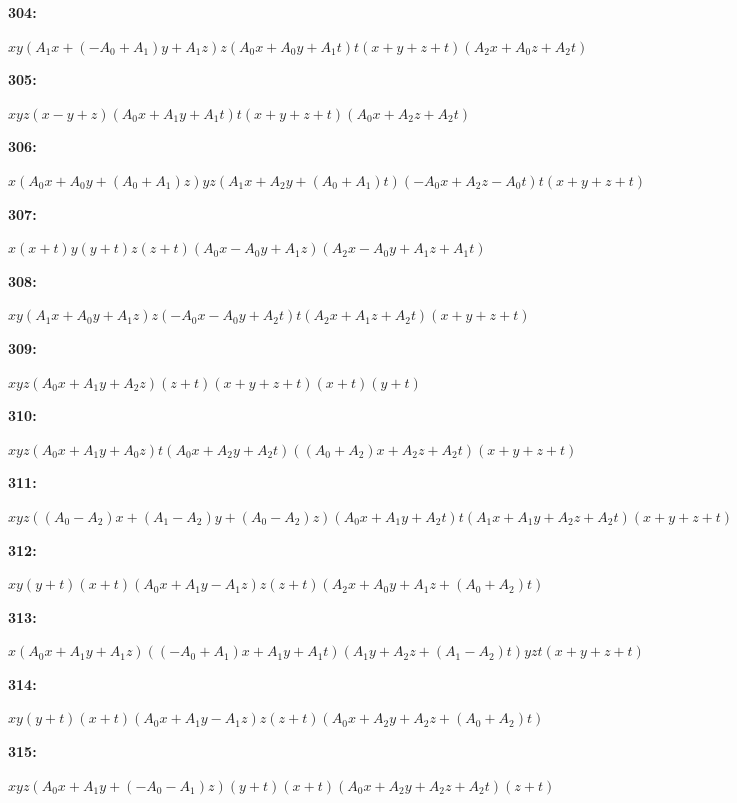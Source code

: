 \documentclass[12pt]{amsart}
\theoremstyle{plain}
\theoremstyle{remark}
\theoremstyle{definition}
\numberwithin{table}{section}
\begin{document}
\noindent\parbox[right]{9mm}{\textbf{304:}}\parbox{3mm}{\hfill}%
\parbox[t]{15cm}{\(xy(A_{1}x + (-A_{0} + A_{1})y + A_{1}z)z(A_{0}x + A_{0}y + A_{1}t)t(x + y + z + t)(A_{2}x + A_{0}z + A_{2}t)\)}

\noindent\parbox[right]{9mm}{\textbf{305:}}\parbox{3mm}{\hfill}%
\parbox[t]{15cm}{\(xyz(x - y + z)(A_{0}x + A_{1}y + A_{1}t)t(x + y + z + t)(A_{0}x + A_{2}z + A_{2}t)\)}

\noindent\parbox[right]{9mm}{\textbf{306:}}\parbox{3mm}{\hfill}%
\parbox[t]{15cm}{\(x(A_{0}x + A_{0}y + (A_{0} + A_{1})z)yz(A_{1}x + A_{2}y + (A_{0} + A_{1})t)(-A_{0}x + A_{2}z - A_{0}t)t(x + y + z + t)\)}

\noindent\parbox[right]{9mm}{\textbf{307:}}\parbox{3mm}{\hfill}%
\parbox[t]{15cm}{\(x(x + t)y(y + t)z(z + t)(A_{0}x - A_{0}y + A_{1}z)(A_{2}x - A_{0}y + A_{1}z + A_{1}t)\)}

\noindent\parbox[right]{9mm}{\textbf{308:}}\parbox{3mm}{\hfill}%
\parbox[t]{15cm}{\(xy(A_{1}x + A_{0}y + A_{1}z)z(-A_{0}x - A_{0}y + A_{2}t)t(A_{2}x + A_{1}z + A_{2}t)(x + y + z + t)\)}

\noindent\parbox[right]{9mm}{\textbf{309:}}\parbox{3mm}{\hfill}%
\parbox[t]{15cm}{\(xyz(A_{0}x + A_{1}y + A_{2}z)(z + t)(x + y + z + t)(x + t)(y + t)\)}

\noindent\parbox[right]{9mm}{\textbf{310:}}\parbox{3mm}{\hfill}%
\parbox[t]{15cm}{\(xyz(A_{0}x + A_{1}y + A_{0}z)t(A_{0}x + A_{2}y + A_{2}t)((A_{0} + A_{2})x + A_{2}z + A_{2}t)(x + y + z + t)\)}

\noindent\parbox[right]{9mm}{\textbf{311:}}\parbox{3mm}{\hfill}%
\parbox[t]{15cm}{\(xyz((A_{0} - A_{2})x + (A_{1} - A_{2})y + (A_{0} - A_{2})z)(A_{0}x + A_{1}y + A_{2}t)t(A_{1}x + A_{1}y + A_{2}z + A_{2}t)(x + y + z + t)\)}

\noindent\parbox[right]{9mm}{\textbf{312:}}\parbox{3mm}{\hfill}%
\parbox[t]{15cm}{\(xy(y + t)(x + t)(A_{0}x + A_{1}y - A_{1}z)z(z + t)(A_{2}x + A_{0}y + A_{1}z + (A_{0} + A_{2})t)\)}

\noindent\parbox[right]{9mm}{\textbf{313:}}\parbox{3mm}{\hfill}%
\parbox[t]{15cm}{\(x(A_{0}x + A_{1}y + A_{1}z)((-A_{0} + A_{1})x + A_{1}y + A_{1}t)(A_{1}y + A_{2}z + (A_{1} - A_{2})t)yzt(x + y + z + t)\)}

\noindent\parbox[right]{9mm}{\textbf{314:}}\parbox{3mm}{\hfill}%
\parbox[t]{15cm}{\(xy(y + t)(x + t)(A_{0}x + A_{1}y - A_{1}z)z(z + t)(A_{0}x + A_{2}y + A_{2}z + (A_{0} + A_{2})t)\)}

\noindent\parbox[right]{9mm}{\textbf{315:}}\parbox{3mm}{\hfill}%
\parbox[t]{15cm}{\(xyz(A_{0}x + A_{1}y + (-A_{0} - A_{1})z)(y + t)(x + t)(A_{0}x + A_{2}y + A_{2}z + A_{2}t)(z + t)\)}
\end{document}
